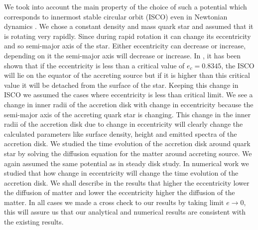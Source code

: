 \documentclass[useAMS,usenatbib]{mn2e}
\begin{document}
We took into account the main property of the choice of such a potential which corresponds to innermost stable circular orbit (ISCO) even in Newtonian dynamics \citep{2013MNRAS.434.2825K}. We chose a constant density and mass quark star and assumed that it is rotating very rapidly. Since during rapid rotation it can change its eccentricity and so semi-major axis of the star. Either eccentricity can decrease or increase, depending on it the semi-major axis will decrease or increase. In \citet{2013MNRAS.434.2825K}, it has been shown that if the eccentricity is less than a critical value of $e_c = 0.8345$, the ISCO will lie on the equator of the accreting source but if it is higher than this critical value it will be detached from the surface of the star. Keeping this change in ISCO we assumed the cases where eccentricity is less than critical limit. We see a change in inner radii of the accretion disk with change in eccentricity because the semi-major axis of the accreting quark star is changing. This change in the inner radii of the accretion disk due to change in eccentricity will clearly change the calculated parameters like surface density, height and emitted spectra of the accretion disk. We studied the time evolution of the accretion disk around quark star by solving the diffusion equation for the matter around accreting source. We again assumed the same potential as in steady disk study. In numerical work we studied that how change in eccentricity will change the time evolution of the accretion disk. We shall describe in the results that higher the eccentricity lower the diffusion of matter and lower the eccentricity higher the diffusion of the matter. In all cases we made a cross check to our results by taking limit $e\rightarrow0$, this will assure us that our analytical and numerical results are consistent with the existing results.
\end{document}

